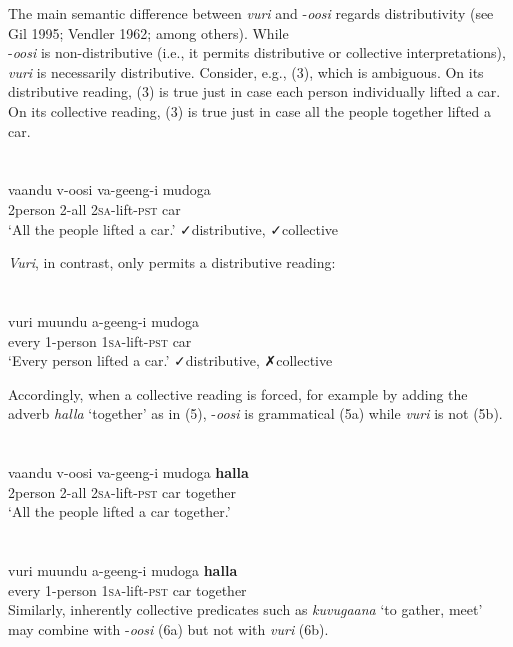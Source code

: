 \documentclass[output=paper]{langsci/langscibook}
\begin{document}
The main semantic difference between \textit{vuri }and -\textit{oosi} regards distributivity (see Gil 1995; Vendler 1962; among others). While \\
{}-\textit{oosi} is non-distributive (i.e., it permits distributive or collective interpretations), \textit{vuri} is necessarily distributive. Consider, e.g., (3), which is ambiguous. On its distributive reading, (3) is true just in case each person individually lifted a car. On its collective reading, (3) is true just in case all the people together lifted a car.

\chapter[  ]{  }
\gll vaandu  v-oosi    va-geeng-i    mudoga\\
     2person  2-all    2\textsc{sa}{}-lift-\textsc{pst    }car\\
\glt ‘All the people lifted a car.’  ✓distributive, ✓collective
\z

\textit{Vuri}, in contrast, only permits a distributive reading:

\chapter[  ]{  }
\gll vuri  muundu  a-geeng-i    mudoga\\
     every  1-person  1\textsc{sa}{}-lift-\textsc{pst    }car\\
\glt ‘Every person lifted a car.’  ✓distributive, ✗collective
\z

Accordingly, when a collective reading is forced, for example by adding the adverb \textit{halla} ‘together’ as in (5), -\textit{oosi} is grammatical (5a) while \textit{vuri} is not (5b).    

\chapter{}
\chapter[]{}
\gll vaandu    v-oosi  va-geeng-i    mudoga  \textbf{halla}\\
     2person  2-all  2\textsc{sa}{}-lift-\textsc{pst  }car    together\\
\glt ‘All the people lifted a car together.’
\z

\chapter{}
\gll *vuri  muundu  a-geeng-i  mudoga  \textbf{halla}\\
     every  1-person  1\textsc{sa}{}-lift-\textsc{pst  }car    together\\
Similarly, inherently collective predicates such as \textit{kuvugaana} ‘to gather, meet’ may combine with -\textit{oosi} (6a) but not with \textit{vuri} (6b).
\end{document}

